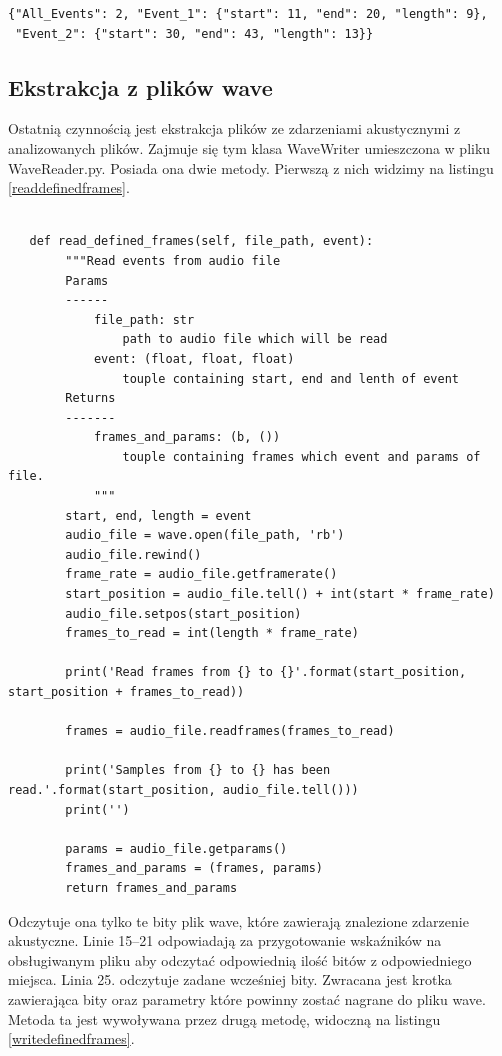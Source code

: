 \documentclass[eng,printmode]{mgr}
\begin{document}
\begin{lstlisting}[caption={Przykładowa zawartość pliku .json},captionpos=b,label={jsoncontent}] 
{"All_Events": 2, "Event_1": {"start": 11, "end": 20, "length": 9},
 "Event_2": {"start": 30, "end": 43, "length": 13}}
\end{lstlisting}

\subsection{Ekstrakcja z plików wave}
Ostatnią czynnością jest ekstrakcja plików ze zdarzeniami akustycznymi z analizowanych plików. Zajmuje się tym klasa WaveWriter umieszczona w pliku WaveReader.py. Posiada ona dwie metody. Pierwszą z nich widzimy na listingu \ref{readdefinedframes}.


\begin{minipage}{\linewidth}
\begin{lstlisting}[caption={fragment kodu źródłowego pliku WaveReader.py,\newline klasa WaveWriter, metoda read\_defined\_frames},captionpos=b,label={readdefinedframes}] 

   def read_defined_frames(self, file_path, event):
        """Read events from audio file
        Params
        ------
            file_path: str
                path to audio file which will be read
            event: (float, float, float)
                touple containing start, end and lenth of event
        Returns
        -------
            frames_and_params: (b, ())
                touple containing frames which event and params of file.
            """
        start, end, length = event
        audio_file = wave.open(file_path, 'rb')
        audio_file.rewind()
        frame_rate = audio_file.getframerate()
        start_position = audio_file.tell() + int(start * frame_rate)
        audio_file.setpos(start_position)
        frames_to_read = int(length * frame_rate)

        print('Read frames from {} to {}'.format(start_position, start_position + frames_to_read))

        frames = audio_file.readframes(frames_to_read)

        print('Samples from {} to {} has been read.'.format(start_position, audio_file.tell()))
        print('')

        params = audio_file.getparams()
        frames_and_params = (frames, params)
        return frames_and_params
\end{lstlisting}
\end{minipage}
Odczytuje ona tylko te bity plik wave, które zawierają znalezione zdarzenie akustyczne. Linie 15--21 odpowiadają za przygotowanie wskaźników na obsługiwanym pliku aby odczytać odpowiednią ilość bitów z odpowiedniego miejsca. Linia 25. odczytuje zadane wcześniej bity. Zwracana jest krotka zawierająca bity oraz parametry które powinny zostać nagrane do pliku wave. Metoda ta jest wywoływana przez drugą metodę, widoczną na listingu \ref{writedefinedframes}.
\end{document}
